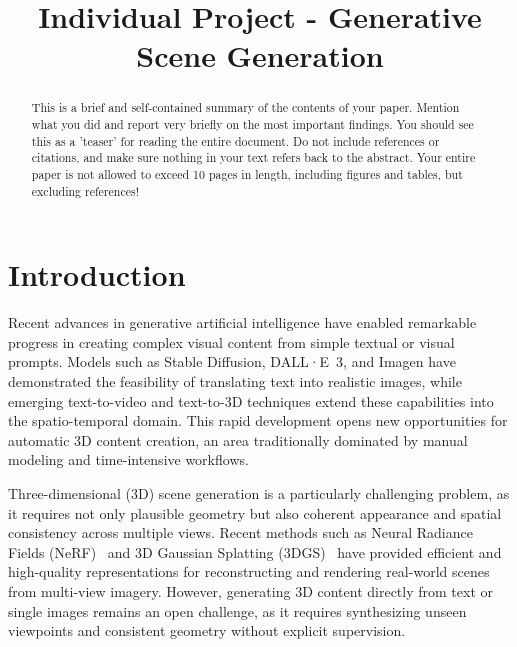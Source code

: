 \documentclass[conference]{IEEEtran}
\begin{document}
\title{Individual Project - Generative Scene Generation}

\author{
}

\maketitle

\begin{abstract}
This is a brief and self-contained summary of the contents of your paper. Mention what you did and report very briefly on the most important findings. You should see this as a 'teaser' for reading the entire document. Do not include references or citations, and make sure nothing in your text refers back to the abstract. Your entire paper is not allowed to exceed 10 pages in length, including figures and tables, but excluding references!
\end{abstract}

\section{Introduction}

Recent advances in generative artificial intelligence have enabled remarkable progress in creating complex visual content from simple textual or visual prompts. Models such as Stable Diffusion, DALL·E~3, and Imagen have demonstrated the feasibility of translating text into realistic images, while emerging text-to-video and text-to-3D techniques extend these capabilities into the spatio-temporal domain. This rapid development opens new opportunities for automatic 3D content creation, an area traditionally dominated by manual modeling and time-intensive workflows.

Three-dimensional (3D) scene generation is a particularly challenging problem, as it requires not only plausible geometry but also coherent appearance and spatial consistency across multiple views. Recent methods such as Neural Radiance Fields (NeRF)~\cite{nerf_paper} and 3D Gaussian Splatting (3DGS)~\cite{3d_gaussian_splatting_paper} have provided efficient and high-quality representations for reconstructing and rendering real-world scenes from multi-view imagery. However, generating 3D content directly from text or single images remains an open challenge, as it requires synthesizing unseen viewpoints and consistent geometry without explicit supervision.
\end{document}
